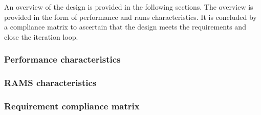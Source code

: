 An overview of the design is provided in the following sections. The overview is provided in the form of performance and \gls{rams} characteristics. It is concluded by a compliance matrix to ascertain that the design meets the requirements and close the iteration loop.

\subsubsection{Performance characteristics} \label{sec:perf}


\newpage
\subsubsection{RAMS characteristics} \label{sec:rams}


\newpage
\subsubsection{Requirement compliance matrix} \label{sec:ComMat}








